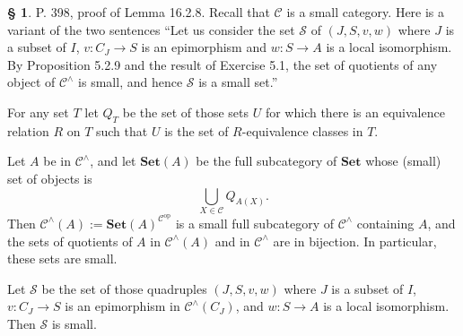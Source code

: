 \documentclass[12pt]{article}
\theoremstyle{remark}
\theoremstyle{definition}
\newtheorem{s}[thm]{\S}
\newcommand{\cc}{\mathcal}
\newcommand{\C}{\mathcal C}
\newcommand{\Set}{\mathbf{Set}}
\DeclareMathOperator{\op}{op}
\begin{document}
\begin{s} 
P. 398, proof of Lemma 16.2.8. Recall that $\C$ is a small category. Here is a variant of the two sentences ``Let us consider the set $\cc S$ of $(J,S,v,w)$ where $J$ is a subset of $I$, $v:C_J\to S$ is an epimorphism and $w:S\to A$ is a local isomorphism. By Proposition 5.2.9 and the result of Exercise 5.1, the set of quotients of any object of $\C^\wedge$ is small, and hence $\cc S$ is a small set.'' 

For any set $T$ let $Q_T$ be the set of those sets $U$ for which there is an equivalence relation $R$ on $T$ such that $U$ is the set of $R$-equivalence classes in $T$. 

Let $A$ be in $\C^\wedge$, and let $\Set(A)$ be the full subcategory of $\Set$ whose (small) set of objects is 
$$
\bigcup_{X\in\C}Q_{A(X)}.
$$ 
Then $\C^\wedge(A):=\Set(A)^{\C^{\op}}$ is a small full subcategory of $\C^\wedge$ containing $A$, and the sets of quotients of $A$ in $\C^\wedge(A)$ and in $\C^\wedge$ are in bijection. In particular, these sets are small. 

Let $\cc S$ be the set of those quadruples $(J,S,v,w)$ where $J$ is a subset of $I$, $v:C_J\to S$ is an epimorphism in $\C^\wedge(C_J)$, and $w:S\to A$ is a local isomorphism. Then $\cc S$ is small.
\end{s}
%
%
\end{document}
